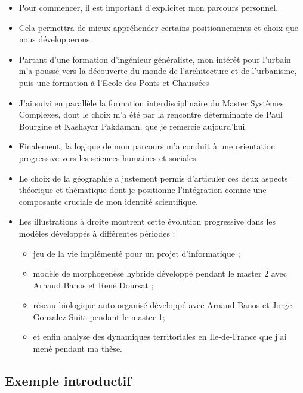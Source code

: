 \documentclass[12pt]{article}
\begin{document}
\begin{itemize}
	\item Pour commencer, il est important d'expliciter mon parcours personnel.
	\item Cela permettra de mieux appréhender certains positionnements et choix que nous développerons.
	\item Partant d'une formation d'ingénieur généraliste, mon intérêt pour l'urbain m'a poussé vers la découverte du monde de l'architecture et de l'urbanisme, puis une formation à l'Ecole des Ponts et Chaussées
	\item J'ai suivi en parallèle la formation interdisciplinaire du Master Systèmes Complexes, dont le choix m'a été par la rencontre déterminante de Paul Bourgine et Kashayar Pakdaman, que je remercie aujourd'hui.
	\item Finalement, la logique de mon parcours m'a conduit à une orientation progressive vers les sciences humaines et sociales
	\item Le choix de la géographie a justement permis d'articuler ces deux aspects théorique et thématique dont je positionne l'intégration comme une composante cruciale de mon identité scientifique.
	\item Les illustrations à droite montrent cette évolution progressive dans les modèles développés à différentes périodes :
	\begin{itemize}
		\item jeu de la vie implémenté pour un projet d'informatique ; 
		\item modèle de morphogenèse hybride développé pendant le master 2 avec Arnaud Banos et René Doursat ;
		\item réseau biologique auto-organisé développé avec Arnaud Banos et Jorge Gonzalez-Suitt pendant le master 1;
		\item et enfin analyse des dynamiques territoriales en Ile-de-France que j'ai mené pendant ma thèse.
	\end{itemize}
\end{itemize}


\newpage



\subsection*{Exemple introductif}
\end{document}
